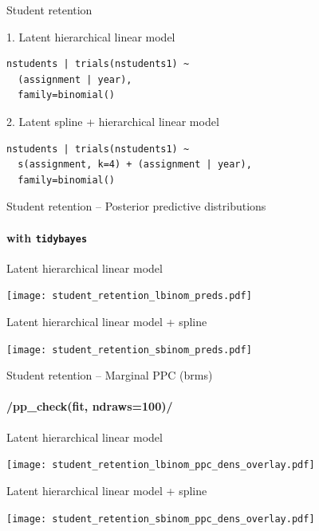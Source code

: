 \documentclass[t]{beamer}
\begin{document}
\begin{frame}[fragile]{Student retention}

1. Latent hierarchical linear model
\begin{verbatim}
nstudents | trials(nstudents1) ~
  (assignment | year),
  family=binomial()
\end{verbatim}

2. Latent spline + hierarchical linear model
\begin{verbatim}
nstudents | trials(nstudents1) ~
  s(assignment, k=4) + (assignment | year),
  family=binomial()
\end{verbatim}
  
\end{frame}

\begin{frame}[fragile]{Student retention -- Posterior predictive distributions}
\framesubtitle{with \texttt{tidybayes}}
  
\vspace{-0.75\baselineskip}  
Latent hierarchical linear model\\  
  \hspace{-7mm}
  \begin{minipage}[t][3.6cm][t]{1.0\linewidth}
    \texttt{[image: student\_retention\_lbinom\_preds.pdf]}
  \end{minipage}
  
\vspace{-0.25\baselineskip}  
Latent hierarchical linear model + spline\\  
  \hspace{-7mm}
  \begin{minipage}[t][3.6cm][t]{1.0\linewidth}
  \texttt{[image: student\_retention\_sbinom\_preds.pdf]}
  \end{minipage}  

\end{frame}

\begin{frame}[fragile]{Student retention -- Marginal PPC (brms)}
\framesubtitle{\rinline/pp_check(fit, ndraws=100)/}

  
\vspace{-0.75\baselineskip}  
Latent hierarchical linear model\\  
  \begin{minipage}[t][3.6cm][t]{1.0\linewidth}
    \texttt{[image: student\_retention\_lbinom\_ppc\_dens\_overlay.pdf]}
  \end{minipage}
  
\vspace{-0.5\baselineskip}  
Latent hierarchical linear model + spline\\  
  \begin{minipage}[t][3.6cm][t]{1.0\linewidth}
    \texttt{[image: student\_retention\_sbinom\_ppc\_dens\_overlay.pdf]}
  \end{minipage}  

\end{frame}
\end{document}
